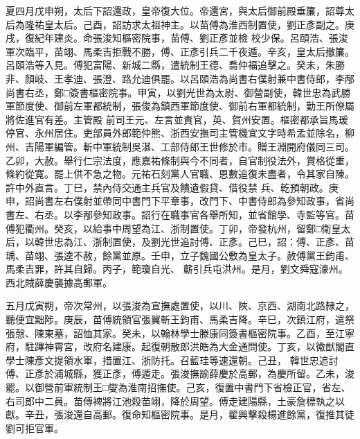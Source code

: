\begin{pinyinscope}
 夏四月戊申朔，太后下詔還政，皇帝復大位。帝還宮，與太后御前殿垂簾，詔尊太后為隆祐皇太后。己酉，詔訪求太祖神主。以苗傅為淮西制置使，劉正彥副之。庚戌，復紀年建炎。命張浚知樞密院事，苗傅、劉正彥並檢
 校少保。呂頤浩、張浚軍次臨平，苗翊、馬柔吉拒戰不勝，傅、正彥引兵二千夜遁。辛亥，皇太后撤簾。呂頤浩等入見。傅犯富陽、新城二縣，遣統制王德、喬仲福追擊之。癸未，朱勝非、顏岐、王孝迪、張澄、路允迪俱罷。以呂頤浩為尚書右僕射兼中書侍郎，李邴尚書右丞，鄭□簽書樞密院事。甲寅，以劉光世為太尉、御營副使，韓世忠為武勝軍節度使、御前左軍都統制，張俊為鎮西軍節度使、御前右軍都統制，勤王所僚屬將佐進官有差。主管殿
 前司王元、左言並責官，英、賀州安置。樞密都承旨馬瑗停官、永州居住。吏部員外郎範仲熊、浙西安撫司主管機宜文字時希孟並除名，柳州、吉陽軍編管。斬中軍統制吳湛、工部侍郎王世修於市。贈王淵開府儀同三司。乙卯，大赦。舉行仁宗法度，應嘉祐條制與今不同者，自官制役法外，賞格從重，條約從寬。罷上供不急之物。元祐石刻黨人官職、恩數追復未盡者，令其家自陳。許中外直言。丁巳，禁內侍交通主兵官及饋遺假貸、借役禁
 兵、乾預朝政。庚申，詔尚書左右僕射並帶同中書門下平章事，改門下、中書侍郎為參知政事，省尚書左、右丞。以李邴參知政事。詔行在職事官各舉所知，並省館學、寺監等官。苗傅犯衢州。癸亥，以給事中周望為江、浙制置使。丁卯，帝發杭州，留鄭□衛皇太后，以韓世忠為江、浙制置使，及劉光世追討傅、正彥。己巳，詔：傅、正彥、苗瑀、苗翊、張逵不赦，餘黨並原。壬申，立子魏國公敷為皇太子。赦傅黨王鈞甫、馬柔吉罪，許其自歸。丙子，範瓊自光、
 蘄引兵屯洪州。是月，劉文舜寇濠州。西北賊薛慶襲據高郵軍。



 五月戊寅朔，帝次常州，以張浚為宣撫處置使，以川、陜、京西、湖南北路隸之，聽便宜黜陟。庚辰，苗傅統領官張翼斬王鈞甫、馬柔吉降。辛巳，次鎮江府，遣祭張愨、陳東墓，詔恤其家。癸未，以翰林學士滕康同簽書樞密院事。乙酉，至江寧府，駐蹕神霄宮，改府名建康。起復朝散郎洪皓為大金通問使。丁亥，以徽猷閣直學士陳彥文提領水軍，措置江、浙防托。召藍珪等速還朝。己丑，
 韓世忠追討傅、正彥於浦城縣，獲正彥，傅遁走。張浚撫諭薛慶於高郵，為慶所留。乙未，浚罷。以御營前軍統制王□燮為淮南招撫使。己亥，復置中書門下省檢正官，省左、右司郎中二員。苗傅裨將江池殺苗翊，降於周望。傅走建陽縣，土豪詹標執之以獻。辛丑，張浚還自高郵。復命知樞密院事。是月，翟興擊殺楊進餘黨，復推其徒劉可拒官軍。




\end{pinyinscope}
